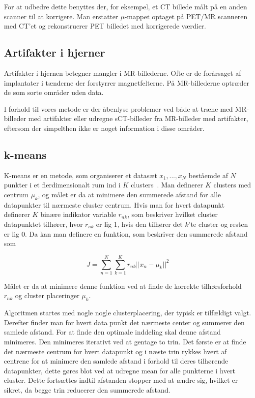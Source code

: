 For at udbedre dette benyttes der, for eksempel, et CT billede målt
på en anden scanner til at korrigere. Man erstatter $\mu$-mappet
optaget på PET/MR scanneren med CT'et og rekonstruerer PET billedet med
korrigerede værdier.

\subsection{Artifakter i hjerner}

Artifakter i hjernen betegner mangler i MR-billederne. Ofte er de
forårsaget af implantater i tænderne der forstyrrer magnetfelterne.
På MR-billederne optræder de som sorte områder uden data.

I forhold til vores metode er der åbenlyse problemer ved både at
træne med MR-billeder med artifakter eller udregne sCT-billeder fra
MR-billeder med artifakter, eftersom der simpelthen ikke er noget
information i disse områder.


\subsection{k-means}

K-means er en metode, som organiserer et datasæt ${x_1,...,x_N}$
beståemde af $N$ punkter i et flerdimensionalt rum ind i $K$ clusters~\cite{bishop}.
Man definerer $K$ clusters med centrum $\mu_k$, og målet er da at
minimere den summerede afstand for alle datapunkter til nærmeste cluster
centrum. Hvis man for hvert datapunkt definerer $K$ binære indikator
variable $r_{nk}$, som beskriver hvilket cluster datapunktet tilhører,
hvor $r_{nk}$ er lig 1, hvis den tilhører det $k$'te cluster og resten
er lig 0. Da kan man definere en funktion, som beskriver den summerede
afstand som

$$
J = \sum_{n=1}^{N} \sum_{k=1}^{K} r_{nk} || x_n - \mu_k ||^2
$$

Målet er da at minimere denne funktion ved at finde de korrekte
tilhørsforhold $r_{nk}$ og cluster placeringer $\mu_k$.

Algoritmen startes med nogle nogle clusterplacering, der typisk
er tilfældigt valgt. Derefter finder man for hvert data punkt det
nærmeste center og summerer den samlede afstand. For at finde den
optimale inddeling skal denne afstand minimeres. Den minimeres iterativt
ved at gentage to trin. Det første er at finde det nærmeste centrum for
hvert datapunkt og i næste trin rykkes hvert af centrene for at minimere
den samlede afstand i forhold til deres tilhørende datapunkter, dette
gøres blot ved at udregne mean for alle punkterne i hvert cluster. Dette
fortsættes indtil afstanden stopper med at ændre sig, hvilket er sikret,
da begge trin reducerer den summerede afstand.

